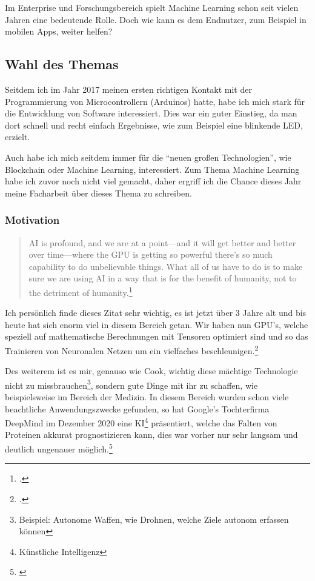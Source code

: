 Im Enterprise und Forschungsbereich spielt Machine Learning schon seit vielen Jahren eine bedeutende Rolle. Doch wie kann es dem Endnutzer, zum Beispiel in mobilen Apps, weiter helfen?

\subsection{Wahl des Themas}

Seitdem ich im Jahr 2017 meinen ersten richtigen Kontakt mit der Programmierung von Microcontrollern (Arduinos) hatte, habe ich mich stark für die Entwicklung von Software interessiert. Dies war ein guter Einstieg, da man dort schnell und recht einfach Ergebnisse, wie zum Beispiel eine blinkende LED, erzielt.

Auch habe ich mich seitdem immer für die "`neuen großen Technologien"', wie Blockchain oder Machine Learning, interessiert. Zum Thema Machine Learning habe ich zuvor noch nicht viel gemacht, daher ergriff ich die Chance dieses Jahr meine Facharbeit über dieses Thema zu schreiben.

\subsubsection{Motivation}

\begin{quotation}
    AI is profound, and we are at a point—and it will get better and better over time—where the GPU is getting so powerful there’s so much capability to do unbelievable things. What all of us have to do is to make sure we are using AI in a way that is for the benefit of humanity, not to the detriment of humanity.\footcite[Tim Cook (CEO von Apple) In einem Interview mit MIT Technology Review]{timcookquote}
\end{quotation}

Ich persönlich finde dieses Zitat sehr wichtig, es ist jetzt über 3 Jahre alt und bis heute hat sich enorm viel in diesem Bereich getan. Wir haben nun GPU's, welche speziell auf mathematische Berechnungen mit Tensoren optimiert sind und so das Trainieren von Neuronalen Netzen um ein vielfaches beschleunigen.\footcite[NVIDIA Grafikprozessoren mit integrierten Tensor Kernen]{nvidiatensorcores}

Des weiterem ist es mir, genauso wie Cook, wichtig diese mächtige Technologie nicht zu missbrauchen\footnote[3]{Beispiel: Autonome Waffen, wie Drohnen, welche Ziele autonom erfassen können}, sondern gute Dinge mit ihr zu schaffen, wie beispielsweise im Bereich der Medizin. In diesem Bereich wurden schon viele beachtliche Anwendungszwecke gefunden, so hat Google's Tochterfirma DeepMind im Dezember 2020 eine KI\footnote[4]{Künstliche Intelligenz} präsentiert, welche das Falten von Proteinen akkurat prognostizieren kann, dies war vorher nur sehr langsam und deutlich ungenauer möglich.\footnote[5]{\cite{deepmindprotein}}

